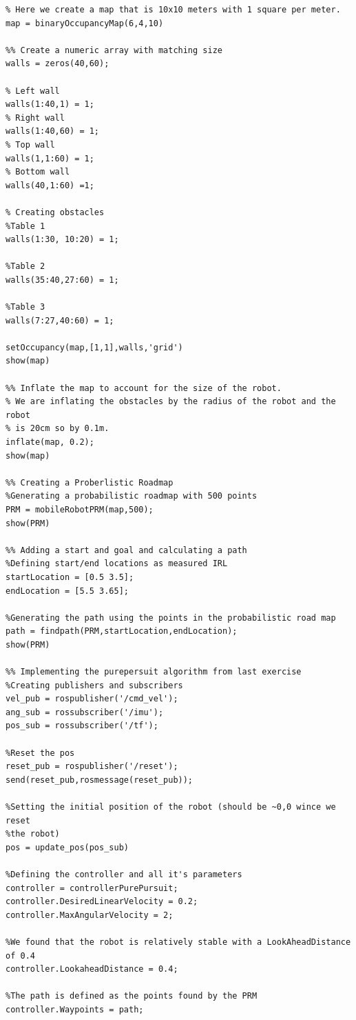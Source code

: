 \documentclass[12pt,a4paper]{article}
\begin{document}
	\begin{lstlisting}[style=Matlab-editor]
%% Create a binary occupancy Map
% Here we create a map that is 10x10 meters with 1 square per meter. 
map = binaryOccupancyMap(6,4,10)

%% Create a numeric array with matching size
walls = zeros(40,60);

% Left wall
walls(1:40,1) = 1;
% Right wall
walls(1:40,60) = 1;
% Top wall
walls(1,1:60) = 1;
% Bottom wall
walls(40,1:60) =1;

% Creating obstacles
%Table 1
walls(1:30, 10:20) = 1;

%Table 2
walls(35:40,27:60) = 1;

%Table 3
walls(7:27,40:60) = 1;

setOccupancy(map,[1,1],walls,'grid')
show(map)

%% Inflate the map to account for the size of the robot. 
% We are inflating the obstacles by the radius of the robot and the robot
% is 20cm so by 0.1m. 
inflate(map, 0.2);
show(map)

%% Creating a Proberlistic Roadmap
%Generating a probabilistic roadmap with 500 points
PRM = mobileRobotPRM(map,500);
show(PRM)

%% Adding a start and goal and calculating a path
%Defining start/end locations as measured IRL
startLocation = [0.5 3.5];
endLocation = [5.5 3.65];

%Generating the path using the points in the probabilistic road map
path = findpath(PRM,startLocation,endLocation);
show(PRM)

%% Implementing the purepersuit algorithm from last exercise
%Creating publishers and subscribers 
vel_pub = rospublisher('/cmd_vel');
ang_sub = rossubscriber('/imu');
pos_sub = rossubscriber('/tf');

%Reset the pos
reset_pub = rospublisher('/reset');
send(reset_pub,rosmessage(reset_pub));

%Setting the initial position of the robot (should be ~0,0 wince we reset
%the robot)
pos = update_pos(pos_sub)

%Defining the controller and all it's parameters
controller = controllerPurePursuit;
controller.DesiredLinearVelocity = 0.2;
controller.MaxAngularVelocity = 2;

%We found that the robot is relatively stable with a LookAheadDistance of 0.4
controller.LookaheadDistance = 0.4;

%The path is defined as the points found by the PRM
controller.Waypoints = path;


\end{lstlisting}
\end{document}
